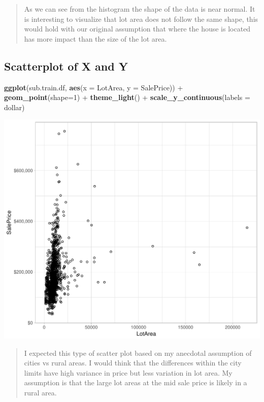\documentclass[]{article}
\newenvironment{Shaded}{\begin{snugshade}}{\end{snugshade}}
\newcommand{\KeywordTok}[1]{\textcolor[rgb]{0.13,0.29,0.53}{\textbf{{#1}}}}
\newcommand{\DataTypeTok}[1]{\textcolor[rgb]{0.13,0.29,0.53}{{#1}}}
\newcommand{\DecValTok}[1]{\textcolor[rgb]{0.00,0.00,0.81}{{#1}}}
\newcommand{\StringTok}[1]{\textcolor[rgb]{0.31,0.60,0.02}{{#1}}}
\newcommand{\NormalTok}[1]{{#1}}
\begin{document}
\begin{quote}
As we can see from the histogram the shape of the data is near normal.
It is interesting to visualize that lot area does not follow the same
shape, this would hold with our original assumption that where the house
is located has more impact than the size of the lot area.
\end{quote}

\newpage

\subsection{Scatterplot of X and Y}\label{scatterplot-of-x-and-y}

\begin{Shaded}
\begin{Highlighting}[]
\KeywordTok{ggplot}\NormalTok{(sub.train.df, }\KeywordTok{aes}\NormalTok{(}\DataTypeTok{x =} \NormalTok{LotArea, }\DataTypeTok{y =} \NormalTok{SalePrice)) +}
\StringTok{    }\KeywordTok{geom_point}\NormalTok{(}\DataTypeTok{shape=}\DecValTok{1}\NormalTok{) +}
\StringTok{    }\KeywordTok{theme_light}\NormalTok{() +}
\StringTok{    }\KeywordTok{scale_y_continuous}\NormalTok{(}\DataTypeTok{labels =} \NormalTok{dollar)}
\end{Highlighting}
\end{Shaded}

\includegraphics{Final_Project_files/figure-latex/scatter plot-1.pdf}

\begin{quote}
I expected this type of scatter plot based on my anecdotal assumption of
cities vs rural areas. I would think that the differences within the
city limits have high variance in price but less variation in lot area.
My assumption is that the large lot areas at the mid sale price is
likely in a rural area.
\end{quote}
\end{document}

